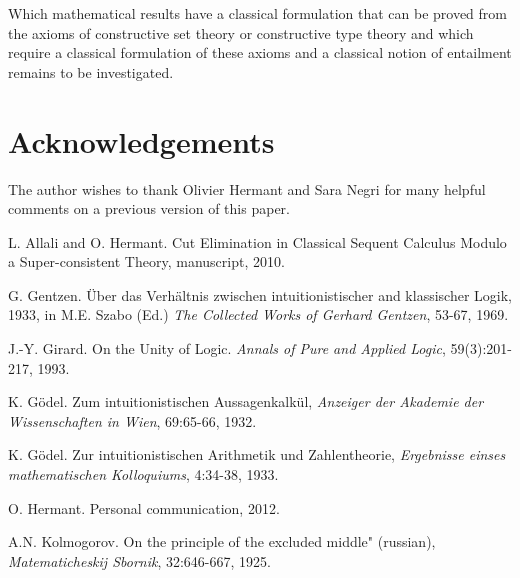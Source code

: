 \documentclass{article}
\begin{document}
Which mathematical results have a classical formulation that can be
proved from the axioms of constructive set theory or constructive type
theory and which require a classical formulation of these axioms 
and a classical notion of entailment remains to be investigated.


\section*{Acknowledgements}

The author wishes to thank Olivier Hermant and Sara Negri for many
helpful comments on a previous version of this paper.


\begin{thebibliography}{99.}

L. Allali and O. Hermant.
Cut Elimination in Classical Sequent Calculus
Modulo a Super-consistent Theory, manuscript, 2010.

 G. Gentzen. \"Uber das Verh\"altnis zwischen
intuitionistischer and klassischer Logik, 1933, in M.E. Szabo (Ed.)
{\em The Collected Works of Gerhard Gentzen}, 53-67, 1969.

J.-Y. Girard. On the Unity of Logic. {\em Annals of Pure and Applied Logic},
59(3):201-217, 1993.

K. G\"odel.  Zum intuitionistischen Aussagenkalk\"ul,
{\em Anzeiger der Akademie der Wissenschaften in Wien}, 69:65-66,
1932.

K. G\"odel.
Zur intuitionistischen Arithmetik und Zahlentheorie, {\em Ergebnisse einses
mathematischen Kolloquiums}, 4:34-38, 1933.

O. Hermant. Personal communication, 2012.

A.N. Kolmogorov. On the principle of the excluded
middle" (russian), {\em Matematicheskij Sbornik}, 32:646-667, 1925.
\end{thebibliography}
\end{document}
